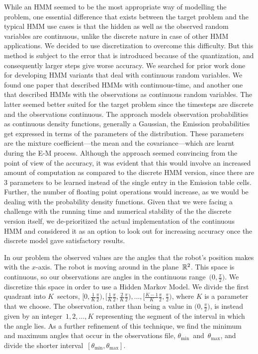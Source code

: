 \documentclass[twoside]{article}
\begin{document}
While an HMM seemed to be the most appropriate way of modelling the problem, one essential difference that exists between the target problem and the typical HMM use cases is that the hidden as well as the observed random variables are continuous, unlike the discrete nature in case of other HMM applications.
We decided to use discretization to overcome this difficulty.
But this method is subject to the error that is introduced because of the quantization, and consequently larger steps give worse accuracy.
We searched for prior work done for developing HMM variants that deal with continuous random variables.
We found one paper that described HMMs with continuous-time, and another one that described HMMs with the observations as continuous random variables.
The latter seemed better suited for the target problem since the timesteps are discrete and the observations continuous.
The approach models observation probabilities as continuous density functions, generally a Gaussian, the Emission probabilities get expressed in terms of the parameters of the distribution.
These parameters are the mixture coefficient---the mean and the covariance---which are learnt during the E-M process.
Although the approach seemed convincing from the point of view of the accuracy, it was evident that this would involve an increased amount of computation as compared to the discrete HMM version, since there are 3 parameters to be learned instead of the single entry in the Emission table cells.
Further, the number of floating point operations would increase, as we would be dealing with the probability density functions.
Given that we were facing a challenge with the running time and numerical stability of the the discrete version itself, we de-prioritized the actual implementation of the continuous HMM and considered it as an option to look out for increasing accuracy once the discrete model gave satisfactory results.

In our problem the observed values are the angles that the robot's position makes with the $x$-axis.
The robot is moving around in the plane~$\mathbb{R}^2$.
This space is continuous, so our observations are angles in the continuous range~$\big(0, \frac{\pi}{2}\big)$.
We discretize this space in order to use a Hidden Markov Model.
We divide the first quadrant into $K$~sectors, ${\textstyle \big[0, \frac{1}{K}\frac{\pi}{2}\big), \big[\frac{1}{K}\frac{\pi}{2}, \frac{2}{K}\frac{\pi}{2}\big), \ldots, \big[\frac{K - 1}{K}\frac{\pi}{2}, \frac{\pi}{2}\big)}$, where $K$ is a parameter that we choose.
The observation, rather than being a value in $\big(0, \frac{\pi}{2}\big)$, is instead given by an integer~${1, 2, \ldots, K}$ representing the segment of the interval in which the angle lies.
As a further refinement of this technique, we find the minimum and maximum angles that occur in the observations file, $\theta_{\text{min}}$~and~$\theta_{\text{max}}$, and divide the shorter interval~$[\theta_{\text{min}}, \theta_{\text{max}}]$.
\end{document}
